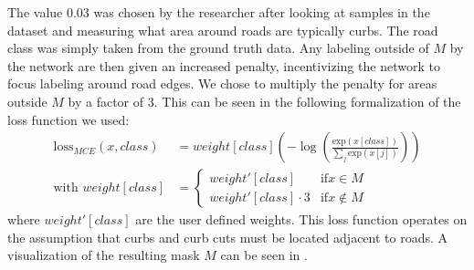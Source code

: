 The value 0.03 was chosen by the researcher after looking at samples in the dataset and measuring what area around roads are typically curbs.
The road class was simply taken from the ground truth data.
Any labeling outside of $M$ by the network are then given an increased penalty, incentivizing the network to focus labeling around road edges.
We chose to multiply the penalty for areas outside $M$ by a factor of 3.
This can be seen in the following formalization of the loss function we used:
\begin{align}\label{eq:mce}
	\text{loss}_{MCE}(x, class) &= weight[class]\left(-\log\left(\frac{\text{exp}(x[class])}{\sum_{j}\text{exp}(x[j])}\right)\right)\\
	\text{with } weight[class] &= 
	\begin{cases}
	weight'[class] & \text{if} x \in M\\
	weight'[class] \cdot 3 & \text{if} x \notin M
	\end{cases}
\end{align}
where $weight'[class]$ are the user defined weights. 
This loss function operates on the assumption that curbs and curb cuts must be located adjacent to roads.
A visualization of the resulting mask $M$ can be seen in .
